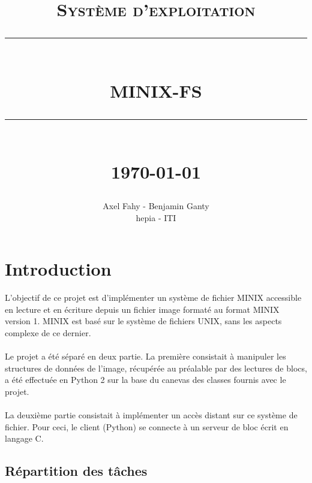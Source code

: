 \documentclass[12pt]{article}
\newcommand{\HRule}[1]{\rule{\linewidth}{#1}}
\begin{document}
\title{ \normalsize \textsc{Système d'exploitation}
        \\ [2.0cm]
        \HRule{0.5pt} \\
        \LARGE \textbf{\uppercase{Minix-FS}}
        \HRule{2pt} \\ [0.5cm]
        \normalsize \today \vspace*{5\baselineskip}}

\date{}

\author{
        Axel Fahy - Benjamin Ganty\\
        hepia - ITI}

\clearpage
\maketitle
\thispagestyle{empty} %
\newpage
\tableofcontents
\newpage

\sectionfont{\scshape}


\section{Introduction}

L'objectif de ce projet est d'implémenter un système de fichier MINIX accessible en 
lecture et en écriture depuis un fichier image formaté au format MINIX version 1.
MINIX est basé sur le système de fichiers UNIX, sans les aspects complexe de ce dernier.
\\\\
Le projet a été séparé en deux partie. La première consistait à manipuler les structures
de données de l'image, récupérée au préalable par des lectures de blocs, a été effectuée
en Python 2 sur la base du canevas des classes fournis avec le projet.
\\\\
La deuxième partie consistait à implémenter un accès distant sur ce système de fichier.
Pour ceci, le client (Python) se connecte à un serveur de bloc écrit en langage C.

\subsection{Répartition des tâches}
\end{document}
